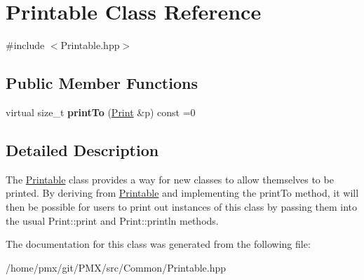 \hypertarget{classPrintable}{}\section{Printable Class Reference}
\label{classPrintable}


{\ttfamily \#include $<$Printable.\+hpp$>$}

\subsection*{Public Member Functions}
\begin{DoxyCompactItemize}
\item 
\mbox{\label{classPrintable_a2c5776bc55c0a3a5675bba9d4d8e3681}} 
virtual size\+\_\+t {\bfseries print\+To} (\hyperlink{classPrint}{Print} \&p) const =0
\end{DoxyCompactItemize}


\subsection{Detailed Description}
The \hyperlink{classPrintable}{Printable} class provides a way for new classes to allow themselves to be printed. By deriving from \hyperlink{classPrintable}{Printable} and implementing the print\+To method, it will then be possible for users to print out instances of this class by passing them into the usual Print\+::print and Print\+::println methods. 

The documentation for this class was generated from the following file\+:\begin{DoxyCompactItemize}
\item 
/home/pmx/git/\+P\+M\+X/src/\+Common/Printable.\+hpp\end{DoxyCompactItemize}
